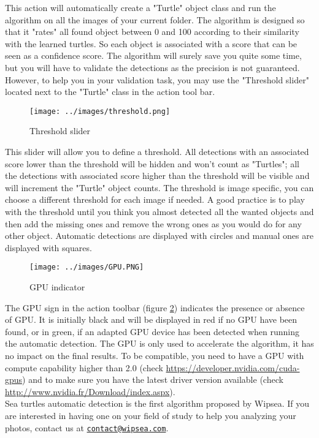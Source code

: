 \documentclass{article}
\begin{document}
This action will automatically create a "Turtle" object class and run the algorithm on all the images of your current folder. The algorithm is designed so that it "rates" all found object between 0 and 100 according to their similarity with the learned turtles. So each object is associated with a score that can be seen as a confidence score. The algorithm will surely save you quite some time, but you will have to validate the detections as the precision is not guaranteed. However, to help you in your validation task, you may use the "Threshold slider" located next to the "Turtle" class in the action tool bar. 
\begin{figure}[!h]
  \centering
  \texttt{[image: ../images/threshold.png]} 
  \caption{\label{fig:threshold} Threshold slider}
\end{figure}
This slider will allow you to define a threshold. All detections with an associated score lower than the threshold will be hidden and won't count as "Turtles"; all the detections with associated score higher than the threshold will be visible and will increment the "Turtle" object counts. The threshold is image specific, you can choose a different threshold for each image if needed. A good practice is to play with the threshold until you think you almost detected all the wanted objects and then add  the missing ones and remove the wrong ones as you would do for any other object.
Automatic detections are displayed with circles and manual ones are displayed with squares.

\begin{figure}[!h]
  \centering
  \texttt{[image: ../images/GPU.PNG]} 
  \caption{\label{fig:gpu} GPU indicator}
\end{figure}
The GPU sign in the action toolbar (figure \ref{fig:gpu}) indicates the presence or absence of GPU. It is initially black and will be displayed in red if no GPU have been found, or in green, if an adapted GPU device has been detected when running the automatic detection. The GPU is only used to accelerate the algorithm, it has no impact on the final results. To be compatible, you need to have a GPU with compute capability higher than 2.0 (check \url{https://developer.nvidia.com/cuda-gpus}) and to make sure you have the latest driver version available (check \url{http://www.nvidia.fr/Download/index.aspx}).
\\
Sea turtles automatic detection is the first algorithm proposed by Wipsea. If you are interested in having one on your field of study to help you analyzing your photos, contact us at \href{mailto:contact@wipsea.com}{\nolinkurl{contact@wipsea.com}}.
\end{document}
